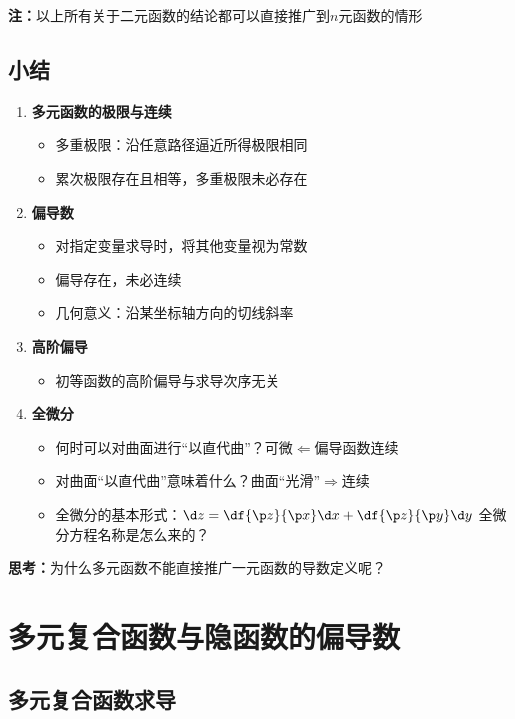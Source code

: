 {\bf 注：}以上所有关于二元函数的结论都可以直接推广到$n$元函数的情形

\subsection*{小结}

\begin{enumerate}[(1)]
  \setlength{\itemindent}{1cm}
  \item {\bf 多元函数的极限与连续}
  \begin{itemize}
    \item 多重极限：沿任意路径逼近所得极限相同
    \item 累次极限存在且相等，多重极限未必存在
  \end{itemize}
  \item {\bf 偏导数}
  \begin{itemize}
    \item 对指定变量求导时，将其他变量视为常数
    \item 偏导存在，未必连续
    \item 几何意义：沿某坐标轴方向的切线斜率
  \end{itemize}
  \item {\bf 高阶偏导}
  \begin{itemize}
    \item 初等函数的高阶偏导与求导次序无关
  \end{itemize}
  \item {\bf 全微分}
  \begin{itemize}
    \item 何时可以对曲面进行“以直代曲”？\hfill 可微$\Leftarrow$偏导函数连续
    \item 对曲面“以直代曲”意味着什么？\hfill 曲面“光滑”$\Rightarrow$连续
    \item 全微分的基本形式：${\d z=\df{\p z}{\p x}\d x+\df{\p z}{\p y}\d y}$
    \hfill 全微分方程名称是怎么来的？
  \end{itemize}
\end{enumerate}

{\bf 思考：}为什么多元函数不能直接推广一元函数的导数定义呢？

\section{多元复合函数与隐函数的偏导数}

\subsection{多元复合函数求导}

